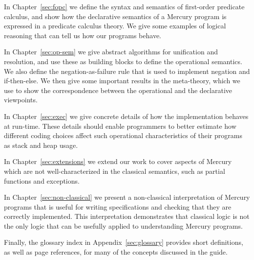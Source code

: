 In Chapter~\ref{sec:fopc} we define
the syntax and semantics of first-order predicate calculus,
and show how the declarative semantics of a Mercury program
is expressed in a predicate calculus theory.
We give some examples of logical reasoning
that can tell us how our programs behave.

In Chapter~\ref{sec:op-sem}
we give abstract algorithms for unification and resolution,
and use these as building blocks to define the operational semantics.
We also define the negation-as-failure rule
that is used to implement negation and if-then-else.
We then give some important results in the meta-theory,
which we use to show the correspondence between
the operational and the declarative viewpoints.

In Chapter~\ref{sec:exec}
we give concrete details of how the implementation
behaves at run-time.
These details should enable programmers to better estimate
how different coding choices affect
such operational characteristics of their programs
as stack and heap usage.

In Chapter~\ref{sec:extensions} we extend our work to cover aspects of Mercury
which are not well-characterized in the classical semantics,
such as partial functions and exceptions.

In Chapter~\ref{sec:non-classical} we present
a non-classical interpretation of Mercury programs
that is useful for writing specifications
and checking that they are correctly implemented.
This interpretation demonstrates that
classical logic is not the only logic
that can be usefully applied to understanding Mercury programs.

Finally,
the glossary index in Appendix~\ref{sec:glossary}
provides short definitions,
as well as page references,
for many of the concepts discussed in the guide.
